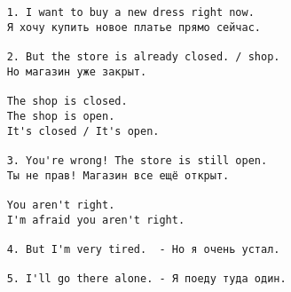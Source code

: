 \subsection*{}
\begin{verbatim}
    1. I want to buy a new dress right now.
    Я хочу купить новое платье прямо сейчас.

    2. But the store is already closed. / shop.
    Но магазин уже закрыт.

    The shop is closed.
    The shop is open.
    It's closed / It's open.

    3. You're wrong! The store is still open.
    Ты не прав! Магазин все ещё открыт.

    You aren't right.
    I'm afraid you aren't right.

    4. But I'm very tired.  - Но я очень устал.

    5. I'll go there alone. - Я поеду туда один.
\end{verbatim}